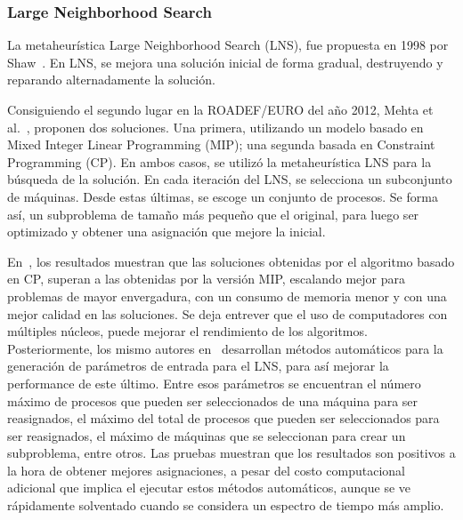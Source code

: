 \documentclass[../informe2.tex]{subfiles}
\begin{document}
\subsubsection{Large Neighborhood Search}
La metaheurística Large Neighborhood Search (LNS), fue propuesta en 1998 por Shaw~\cite{shaw1998using}. En LNS, se mejora una solución inicial de forma gradual, destruyendo y reparando alternadamente la solución. \par
\noindent Consiguiendo el segundo lugar en la ROADEF/EURO del año 2012, Mehta et al.~\cite{mehta2012comparing}, proponen dos soluciones. Una primera, utilizando un modelo basado en Mixed Integer Linear Programming (MIP); una segunda basada en Constraint Programming (CP). En ambos casos, se utilizó la metaheurística LNS para la búsqueda de la solución. En cada iteración del LNS, se selecciona un subconjunto de máquinas. Desde estas últimas, se escoge un conjunto de procesos. Se forma así, un subproblema de tamaño más pequeño que el original, para luego ser optimizado y obtener una asignación que mejore la inicial. \par
\noindent En~\cite{mehta2012comparing}, los resultados muestran que las soluciones obtenidas por el algoritmo basado en CP, superan a las obtenidas por la versión MIP, escalando mejor para problemas de mayor envergadura, con un consumo de memoria menor y con una mejor calidad en las soluciones. Se deja entrever que el uso de computadores con múltiples núcleos, puede mejorar el rendimiento de los algoritmos. Posteriormente, los mismo autores en~\cite{malitsky2013tuning} desarrollan métodos automáticos para la generación de parámetros de entrada para el LNS, para así mejorar la performance de este último. Entre esos parámetros se encuentran el número máximo de procesos que pueden ser seleccionados de una máquina para ser reasignados, el máximo del total de procesos que pueden ser seleccionados para ser reasignados, el máximo de máquinas que se seleccionan para crear un subproblema, entre otros. Las pruebas muestran que los resultados son positivos a la hora de obtener mejores asignaciones, a pesar del costo computacional adicional que implica el ejecutar estos métodos automáticos, aunque se ve rápidamente solventado cuando se considera un espectro de tiempo más amplio.
\end{document}
